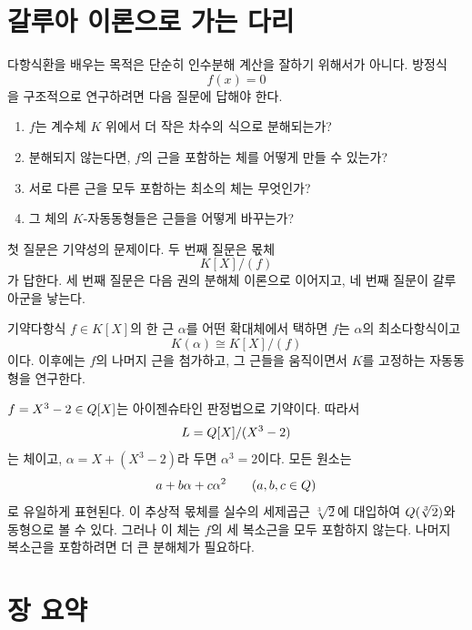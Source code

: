 \section{갈루아 이론으로 가는 다리}
\label{sec:polynomial-galois-bridge}

다항식환을 배우는 목적은 단순히 인수분해 계산을 잘하기 위해서가 아니다. 방정식
\[
  f(x)=0
\]
을 구조적으로 연구하려면 다음 질문에 답해야 한다.

\begin{enumerate}
  \item $f$는 계수체 $K$ 위에서 더 작은 차수의 식으로 분해되는가?
  \item 분해되지 않는다면, $f$의 근을 포함하는 체를 어떻게 만들 수 있는가?
  \item 서로 다른 근을 모두 포함하는 최소의 체는 무엇인가?
  \item 그 체의 $K$-자동동형들은 근들을 어떻게 바꾸는가?
\end{enumerate}

첫 질문은 기약성의 문제이다. 두 번째 질문은 몫체
\[
  K[X]/(f)
\]
가 답한다. 세 번째 질문은 다음 권의 분해체 이론으로 이어지고, 네 번째 질문이 갈루아군을 낳는다.

\begin{keyidea}
기약다항식 $f\in K[X]$의 한 근 $\alpha$를 어떤 확대체에서 택하면 $f$는 $\alpha$의 최소다항식이고
\[
 K(\alpha)\cong K[X]/(f)
\]
이다. 이후에는 $f$의 나머지 근을 첨가하고, 그 근들을 움직이면서 $K$를 고정하는 자동동형을 연구한다.
\end{keyidea}

\begin{example}
$f=X^3-2\in Q[X]$는 아이젠슈타인 판정법으로 기약이다. 따라서
\[
  L=Q[X]/(X^3-2)
\]
는 체이고, $\alpha=X+(X^3-2)$라 두면 $\alpha^3=2$이다. 모든 원소는
\[
  a+b\alpha+c\alpha^2\qquad(a,b,c\in Q)
\]
로 유일하게 표현된다. 이 추상적 몫체를 실수의 세제곱근 $\sqrt[3]{2}$에 대입하여 $Q(\sqrt[3]{2})$와 동형으로 볼 수 있다. 그러나 이 체는 $f$의 세 복소근을 모두 포함하지 않는다. 나머지 복소근을 포함하려면 더 큰 분해체가 필요하다.
\end{example}

\clearpage
\section{장 요약}

